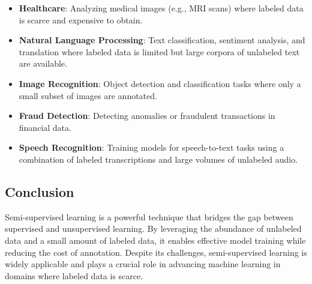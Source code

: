 \begin{itemize}
    \item \textbf{Healthcare}:
    Analyzing medical images (e.g., MRI scans) where labeled data is scarce and expensive to obtain.
    \item \textbf{Natural Language Processing}:
    Text classification, sentiment analysis, and translation where labeled data is limited but large corpora of unlabeled text are available.
    \item \textbf{Image Recognition}:
    Object detection and classification tasks where only a small subset of images are annotated.
    \item \textbf{Fraud Detection}:
    Detecting anomalies or fraudulent transactions in financial data.
    \item \textbf{Speech Recognition}:
    Training models for speech-to-text tasks using a combination of labeled transcriptions and large volumes of unlabeled audio.
\end{itemize}

\subsection*{Conclusion}

Semi-supervised learning is a powerful technique that bridges the gap between supervised and unsupervised learning. By leveraging the abundance of unlabeled data and a small amount of labeled data, it enables effective model training while reducing the cost of annotation. Despite its challenges, semi-supervised learning is widely applicable and plays a crucial role in advancing machine learning in domains where labeled data is scarce.
